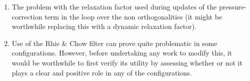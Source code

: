 \begin{enumerate}
\item The problem with the relaxation factor used during updates of the pressure-correction term in the loop over the non orthogonalities (it might be worthwhile replacing this with a dynamic relaxation factor).

\item Use of the Rhie \& Chow filter can prove quite problematic in some configurations. However, before undertaking any work to modify this, it would be worthwhile to first verify its utility by assessing whether or not it plays a clear and positive role in any of the configurations.

\end{enumerate}

